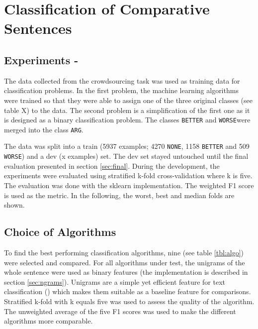 \chapter{Classification of Comparative Sentences}
\section{Experiments -}
The data collected from the crowdsourcing task was used as training data for classification problems. In the first problem, the machine learning algorithms were trained so that they were able to assign one of the three original classes (see table X) to the data. The second problem is a simplification of the first one as it is designed as a binary classification problem. The classes \texttt{BETTER} and \texttt{WORSE}were merged into the class \texttt{ARG}.


The data was split into a train (5937 examples; 4270 \texttt{NONE}, 1158 \texttt{BETTER} and 509 \texttt{WORSE}) and a dev (x examples) set. The dev set stayed untouched until the final evaluation presented in section \ref{sec:final}. During the development, the experiments were evaluated using stratified k-fold cross-validation where k is five. The evaluation was done with the sklearn implementation. The weighted F1 score is used as the metric. In the following, the worst, best and median folds are shown.

\section{Choice of Algorithms}
To find the best performing classification algorithms, nine (see table \ref{tbl:algo}) were selected and compared. For all algorithms under test, the unigrams of the whole sentence were used as binary features (the implementation is described in section \ref{sec:ngrams}). Unigrams are a simple yet efficient feature for text classification (\cite{cavnar1994n}) which makes them suitable as a baseline feature for comparisons. Stratified k-fold with k equals five was used to assess the quality of the algorithm. The unweighted average of the five F1 scores was used to make the different algorithms more comparable.

